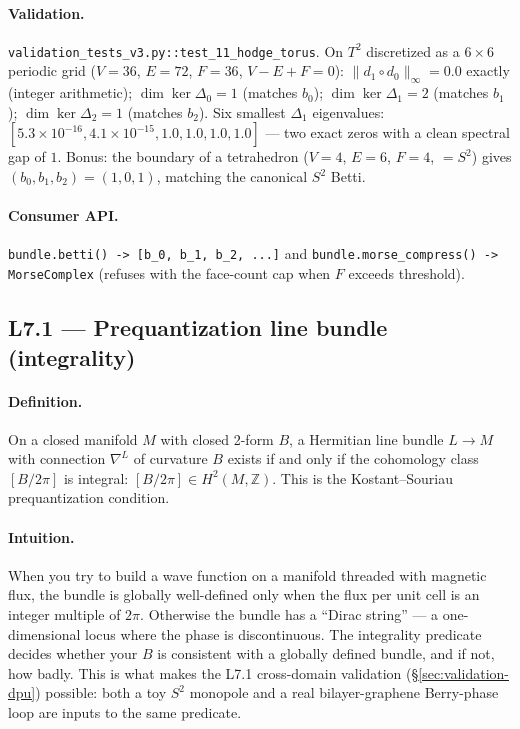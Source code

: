 \documentclass[11pt,letterpaper]{article}
\begin{document}
\paragraph{Validation.}
\texttt{validation\_tests\_v3.py::test\_11\_hodge\_torus}. On
$T^2$ discretized as a $6 \times 6$ periodic grid ($V = 36$, $E =
72$, $F = 36$, $V - E + F = 0$):
$\|d_1 \circ d_0\|_\infty = 0.0$ exactly (integer arithmetic);
$\dim \ker \Delta_0 = 1$ (matches $b_0$); $\dim \ker \Delta_1 = 2$
(matches $b_1$); $\dim \ker \Delta_2 = 1$ (matches $b_2$). Six
smallest $\Delta_1$ eigenvalues: $[5.3 \times 10^{-16}, 4.1 \times
10^{-15}, 1.0, 1.0, 1.0, 1.0]$ --- two exact zeros with a clean
spectral gap of $1$. Bonus: the boundary of a tetrahedron ($V = 4$,
$E = 6$, $F = 4$, $= S^2$) gives $(b_0, b_1, b_2) = (1, 0, 1)$,
matching the canonical $S^2$ Betti.

\paragraph{Consumer API.}
\verb|bundle.betti() -> [b_0, b_1, b_2, ...]| and
\verb|bundle.morse_compress() -> MorseComplex| (refuses with the
face-count cap when $F$ exceeds threshold).


\subsection{L7.1 --- Prequantization line bundle (integrality)}

\paragraph{Definition.}
On a closed manifold $M$ with closed 2-form $B$, a Hermitian line
bundle $L \to M$ with connection $\nabla^L$ of curvature $B$ exists
if and only if the cohomology class $[B / 2\pi]$ is integral:
$[B / 2\pi] \in H^2(M, \mathbb{Z})$. This is the
Kostant--Souriau prequantization condition.

\paragraph{Intuition.}
When you try to build a wave function on a manifold threaded with
magnetic flux, the bundle is globally well-defined only when the
flux per unit cell is an integer multiple of $2\pi$. Otherwise the
bundle has a ``Dirac string'' --- a one-dimensional locus where the
phase is discontinuous. The integrality predicate decides whether
your $B$ is consistent with a globally defined bundle, and if not,
how badly. This is what makes the L7.1 cross-domain validation
(\S\ref{sec:validation-dpu}) possible: both a toy $S^2$ monopole
and a real bilayer-graphene Berry-phase loop are inputs to the same
predicate.
\end{document}

